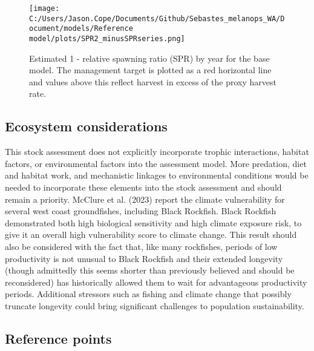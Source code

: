 \documentclass[11pt,
  english,
  letterpaper,
]{article}
\begin{document}
\begin{figure}
\centering
\texttt{[image: C:/Users/Jason.Cope/Documents/Github/Sebastes\_melanops\_WA/Document/models/Reference model/plots/SPR2\_minusSPRseries.png]}
\caption{Estimated 1 - relative spawning ratio (SPR) by year for the base model. The management target is plotted as a red horizontal line and values above this reflect harvest in excess of the proxy harvest rate.\label{fig:es-1-spr}}
\end{figure}

\clearpage

\hypertarget{ecosystem-considerations}{%
\subsection*{Ecosystem considerations}\label{ecosystem-considerations}}

This stock assessment does not explicitly incorporate trophic interactions, habitat factors, or environmental factors into the assessment model. More predation, diet and habitat work, and mechanistic linkages to environmental conditions would be needed to incorporate these elements into the stock assessment and should remain a priority. McClure et al. (2023) report the climate vulnerability for several west coast groundfishes, including Black Rockfish. Black Rockfish demonstrated both high biological sensitivity and high climate exposure risk, to give it an overall high vulnerability score to climate change. This result should also be considered with the fact that, like many rockfishes, periods of low productivity is not unusual to Black Rockfish and their extended longevity (though admittedly this seems shorter than previously believed and should be reconsidered) has historically allowed them to wait for advantageous productivity periods. Additional stressors such as fishing and climate change that possibly truncate longevity could bring significant challenges to population sustainability.

\hypertarget{reference-points}{%
\subsection*{Reference points}\label{reference-points}}
\end{document}

